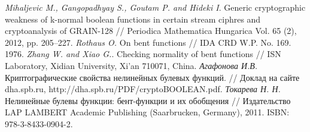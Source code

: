 \begin{thebibliography}{99}
 {\it Mihaljevic M., Gangopadhyay S., Goutam P. and Hideki I}. Generic cryptographic weakness of k-normal boolean functions in certain stream ciphres and cryptoanalysis of GRAIN-128 // Periodica Mathematica Hungarica Vol. 65 (2), 2012, pp. 205–227.
 {\it Rothaus O.} On bent functions // IDA CRD W.P. No. 169. 1976.
 {\it Zhang W. and Xiao G.}. Checking normality of bent functions // ISN Laboratory, Xidian University, Xi’an 710071, China.
 {\it Агафонова И.В.} Криптографические свойства нелинейных булевых функций. // Доклад на сайте dha.spb.ru, http://dha.spb.ru/PDF/cryptoBOOLEAN.pdf.
 {\it Токарева Н. Н.} Нелинейные булевы функции: бент-функции и их обобщения // Издательство LAP LAMBERT Academic Publishing (Saarbrucken, Germany), 2011. ISBN: 978-3-8433-0904-2.









\end{thebibliography}
